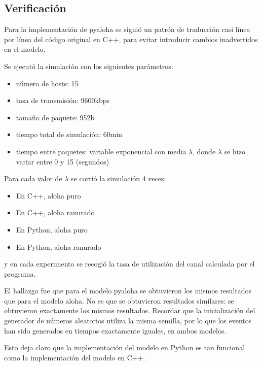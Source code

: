 \documentclass[]{article}
\begin{document}
\subsection{Verificación}

Para la implementación de pyaloha se siguió un patrón de traducción casi línea
por línea del código original en C++, para evitar introducir cambios
inadvertidos en el modelo.

Se ejecutó la simulación con los siguientes parámetros:

\begin{itemize}
    \item número de hosts: 15

    \item tasa de transmisión: 9600kbps

    \item tamaño de paquete: 952b

    \item tiempo total de simulación: 60min

    \item tiempo entre paquetes: variable exponencial con media $\lambda$,
donde $\lambda$ se hizo variar entre 0 y 15 (segundos)
\end{itemize}

Para cada valor de $\lambda$ se corrió la simulación 4 veces:

\begin{itemize}
    \item En C++, aloha puro
    \item En C++, aloha ranurado
    \item En Python, aloha puro
    \item En Python, aloha ranurado
\end{itemize}

\noindent y en cada experimento se recogió la tasa de utilización del canal
calculada por el programa.

El hallazgo fue que para el modelo pyaloha se obtuvieron los mismos resultados
que para el modelo aloha. No es que se obtuvieron resultados similares: se
obtuvieron exactamente los mismos resultados. Recordar que la inicialización
del generador de números aleatorios utiliza la misma semilla, por lo que los
eventos han sido generados en tiempos exactamente iguales, en ambos modelos.

Esto deja claro que la implementación del modelo en Python es tan funcional
como la implementación del modelo en C++.
\end{document}
